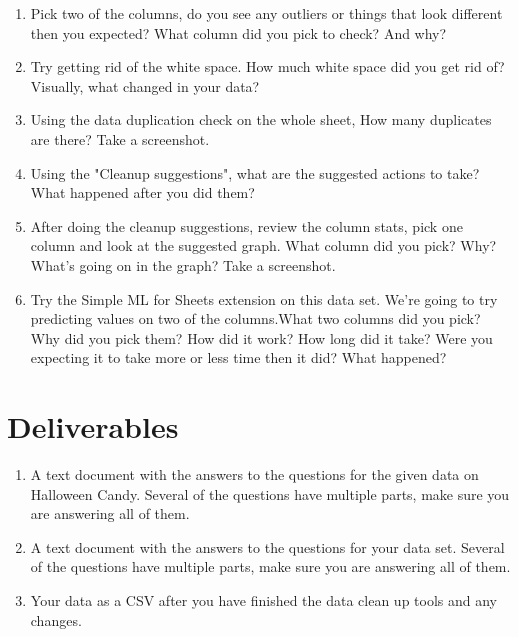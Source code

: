 \documentclass[12pt]{article}
\begin{document}
    \begin{enumerate}
        \item Pick two of the columns, do you see any outliers or things that look different then you expected? What column did you pick to check? And why?
        \item Try getting rid of the white space.  How much white space did you get rid of? Visually, what changed in your data?
        \item Using the data duplication check on the whole sheet, How many duplicates are there? Take a screenshot.
        \item Using the "Cleanup suggestions", what are the suggested actions to take? What happened after you did them? 
        \item After doing the cleanup suggestions, review the column stats, pick one column and look at the suggested graph.  What column did you pick? Why? What's going on in the graph? Take a screenshot.
        \item Try the Simple ML for Sheets extension on this data set. We're going to try predicting values on two of the columns.What two columns did you pick? Why did you pick them? How did it work? How long did it take? Were you expecting it to take more or less time then it did? What happened?
    \end{enumerate}


\section*{Deliverables}

\begin{enumerate}
    \item A text document with the answers to the questions for the given data on Halloween Candy.  Several of the questions have multiple parts, make sure you are answering all of them.
    \item A text document with the answers to the questions for your data set.  Several of the questions have multiple parts, make sure you are answering all of them.
    \item Your data as a CSV after you have finished the data clean up tools and any changes. 
\end{enumerate}
\end{document}
